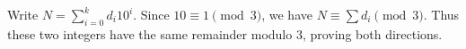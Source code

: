 Write $N=\sum_{i=0}^k d_i10^i$. Since $10\equiv1\pmod3$, we have $N\equiv\sum d_i\pmod3$. Thus these two integers have the same remainder modulo $3$, proving both directions.
